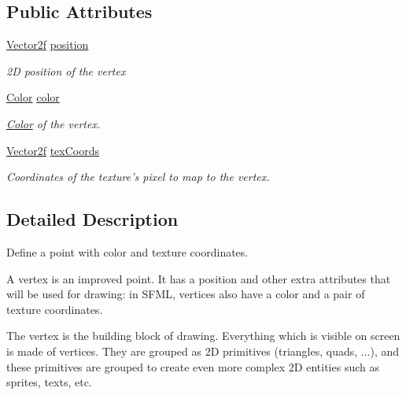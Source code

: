 \subsection*{Public Attributes}
\begin{DoxyCompactItemize}
\item 
\hypertarget{classsf_1_1Vertex_a8a4e0f4dfa7f1eb215c92e93d04f0ac0}{\hyperlink{classsf_1_1Vector2}{Vector2f} \hyperlink{classsf_1_1Vertex_a8a4e0f4dfa7f1eb215c92e93d04f0ac0}{position}}\label{classsf_1_1Vertex_a8a4e0f4dfa7f1eb215c92e93d04f0ac0}

\begin{DoxyCompactList}\small\item\em 2\-D position of the vertex \end{DoxyCompactList}\item 
\hypertarget{classsf_1_1Vertex_a799faa0629442e90f07cd2edb568ff80}{\hyperlink{classsf_1_1Color}{Color} \hyperlink{classsf_1_1Vertex_a799faa0629442e90f07cd2edb568ff80}{color}}\label{classsf_1_1Vertex_a799faa0629442e90f07cd2edb568ff80}

\begin{DoxyCompactList}\small\item\em \hyperlink{classsf_1_1Color}{Color} of the vertex. \end{DoxyCompactList}\item 
\hypertarget{classsf_1_1Vertex_a9e79bd05818d36c4789751908037097c}{\hyperlink{classsf_1_1Vector2}{Vector2f} \hyperlink{classsf_1_1Vertex_a9e79bd05818d36c4789751908037097c}{tex\-Coords}}\label{classsf_1_1Vertex_a9e79bd05818d36c4789751908037097c}

\begin{DoxyCompactList}\small\item\em Coordinates of the texture's pixel to map to the vertex. \end{DoxyCompactList}\end{DoxyCompactItemize}


\subsection{Detailed Description}
Define a point with color and texture coordinates. 

A vertex is an improved point. It has a position and other extra attributes that will be used for drawing\-: in S\-F\-M\-L, vertices also have a color and a pair of texture coordinates.

The vertex is the building block of drawing. Everything which is visible on screen is made of vertices. They are grouped as 2\-D primitives (triangles, quads, ...), and these primitives are grouped to create even more complex 2\-D entities such as sprites, texts, etc.


